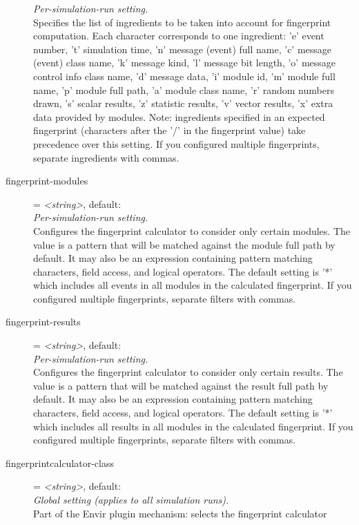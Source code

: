 \begin{description}
    \textit{Per-simulation-run setting.}\\
    Specifies the list of ingredients to be taken into account for fingerprint
    computation. Each character corresponds to one ingredient: 'e' event
    number, 't' simulation time, 'n' message (event) full name, 'c' message
    (event) class name, 'k' message kind, 'l' message bit length, 'o' message
    control info class name, 'd' message data, 'i' module id, 'm' module full
    name, 'p' module full path, 'a' module class name, 'r' random numbers
    drawn, 's' scalar results, 'z' statistic results, 'v' vector results, 'x'
    extra data provided by modules. Note: ingredients specified in an expected
    fingerprint (characters after the '/' in the fingerprint value) take
    precedence over this setting. If you configured multiple fingerprints,
    separate ingredients with commas.
\item[fingerprint-modules] = \textit{<string>}, default: \ttt{*}\\
    \textit{Per-simulation-run setting.}\\
    Configures the fingerprint calculator to consider only certain modules. The
    value is a pattern that will be matched against the module full path by
    default. It may also be an expression containing pattern matching
    characters, field access, and logical operators. The default setting is '*'
    which includes all events in all modules in the calculated fingerprint. If
    you configured multiple fingerprints, separate filters with commas.
\item[fingerprint-results] = \textit{<string>}, default: \ttt{*}\\
    \textit{Per-simulation-run setting.}\\
    Configures the fingerprint calculator to consider only certain results. The
    value is a pattern that will be matched against the result full path by
    default. It may also be an expression containing pattern matching
    characters, field access, and logical operators. The default setting is '*'
    which includes all results in all modules in the calculated fingerprint. If
    you configured multiple fingerprints, separate filters with commas.
\item[fingerprintcalculator-class] = \textit{<string>}, default: \\
    \textit{Global setting (applies to all simulation runs).}\\
    Part of the Envir plugin mechanism: selects the fingerprint calculator

\end{description}
